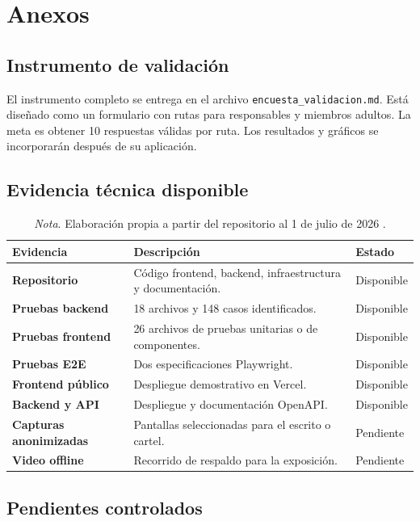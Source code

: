 \appendix
\section{Anexos}

\subsection{Instrumento de validación}

El instrumento completo se entrega en el archivo
\texttt{encuesta\_validacion.md}. Está diseñado como un formulario con rutas para
responsables y miembros adultos. La meta es obtener 10 respuestas válidas por
ruta. Los resultados y gráficos se incorporarán después de su aplicación.

\subsection{Evidencia técnica disponible}

\begin{table}[H]
\caption{Inventario de evidencia técnica}
\begin{tabularx}{\textwidth}{>{\bfseries}p{4cm}X p{3cm}}
\toprule
Evidencia & Descripción & Estado \\
\midrule
Repositorio & Código frontend, backend, infraestructura y documentación. & Disponible \\
Pruebas backend & 18 archivos y 148 casos identificados. & Disponible \\
Pruebas frontend & 26 archivos de pruebas unitarias o de componentes. & Disponible \\
Pruebas E2E & Dos especificaciones Playwright. & Disponible \\
Frontend público & Despliegue demostrativo en Vercel. & Disponible \\
Backend y API & Despliegue y documentación OpenAPI. & Disponible \\
Capturas anonimizadas & Pantallas seleccionadas para el escrito o cartel. & Pendiente \\
Video offline & Recorrido de respaldo para la exposición. & Pendiente \\
\bottomrule
\end{tabularx}
\caption*{\textit{Nota}. Elaboración propia a partir del repositorio al 1 de julio de 2026 \parencite{gymhub_repo}.}
\end{table}

\subsection{Pendientes controlados}

